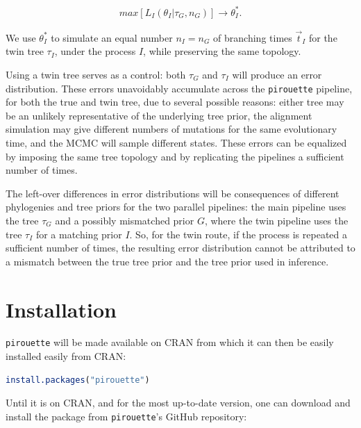 \documentclass{article}
\begin{document}
\begin{align}
    max[L_{\mathit{I}}(\theta_{\mathit{I}}|\tau_{\mathit{G}}, n_{\mathit{G}})] 
\rightarrow \theta^{*}_{\mathit{I}}.
\end{align}

We use $\theta^{*}_{\mathit{I}}$ to simulate an equal number 
$n_{\mathit{I}} = n_{\mathit{G}}$ 
of branching times $\Vec{t}_{\mathit{I}}$ for the twin tree 
$\tau_{\mathit{I}}$, under the process $\mathit{I}$, 
while preserving the same topology.

Using a twin tree serves as a control: both $\tau_{\mathit{G}}$ and 
$\tau_{\mathit{I}}$ will produce an error distribution. 
These errors unavoidably accumulate across the \verb;pirouette; pipeline,
for both the true and twin tree, due to several possible reasons: either tree may be an unlikely representative
of the underlying tree prior, the alignment simulation may give different
numbers of mutations for the same evolutionary time, 
and the MCMC will sample different states.
These errors can be equalized by imposing the same tree topology and by
replicating the pipelines a sufficient number of times.

The left-over differences in error distributions will be 
consequences of different phylogenies and tree priors for the two parallel 
pipelines: the main pipeline uses the tree $\tau_{\mathit{G}}$ and a
possibly mismatched prior $\mathit{G}$, where the twin pipeline
uses the tree $\tau_{\mathit{I}}$ for a matching prior $\mathit{I}$.
So, for the twin route, if the process is repeated a sufficient number of times, the resulting error distribution cannot be 
attributed to a mismatch between the true tree prior and the tree prior used in
inference.

\section{Installation}

\verb;pirouette; will be made available on CRAN from which it can then be easily installed easily from CRAN:
\begin{lstlisting}[language=R, floatplacement=ht, frame=single]
install.packages("pirouette")
\end{lstlisting}

Until it is on CRAN, and for the most up-to-date version, 
one can download and install the package from \verb;pirouette;'s GitHub 
repository:
\end{document}
